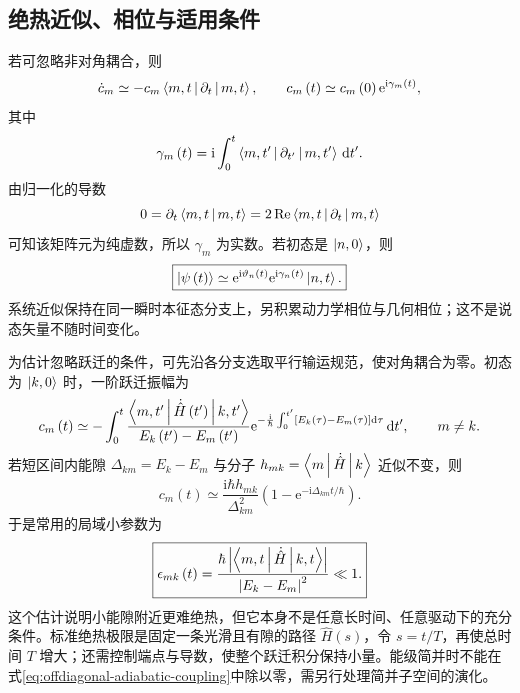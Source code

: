 \subsection{绝热近似、相位与适用条件}
若可忽略非对角耦合，则
\begin{equation}
\dot c_m\simeq-c_m\Braket{m,t|\partial_t|m,t},\qquad
c_m\left(t\right)\simeq c_m\left(0\right)\mathrm{e}^{\mathrm{i}\gamma_m\left(t\right)},
\end{equation}
其中
\begin{equation}
\gamma_m\left(t\right)=\mathrm{i}\int_0^t
\Braket{m,t'|\partial_{t'}|m,t'}\,\mathrm{d}t'.
\label{eq:adiabatic-geometric-phase}
\end{equation}
由归一化的导数
\begin{equation}
0=\partial_t\Braket{m,t|m,t}
=2\operatorname{Re}\Braket{m,t|\partial_t|m,t}
\end{equation}
可知该矩阵元为纯虚数，所以 $\gamma_m$ 为实数。若初态是 $\Ket{n,0}$，则
\begin{equation}
\boxed{\Ket{\psi\left(t\right)}\simeq
\mathrm{e}^{\mathrm{i}\vartheta_n\left(t\right)}
\mathrm{e}^{\mathrm{i}\gamma_n\left(t\right)}\Ket{n,t}.}
\label{eq:adiabatic-state}
\end{equation}
系统近似保持在同一瞬时本征态分支上，另积累动力学相位与几何相位；这不是说态矢量不随时间变化。

为估计忽略跃迁的条件，可先沿各分支选取平行输运规范，使对角耦合为零。初态为 $\Ket{k,0}$ 时，一阶跃迁振幅为
\begin{equation}
c_m\left(t\right)\simeq-\int_0^t
\frac{\Braket{m,t'|\dot{\hat H}\left(t'\right)|k,t'}}{E_k\left(t'\right)-E_m\left(t'\right)}
\mathrm{e}^{-\frac{\mathrm{i}}\hbar\int_0^{t'}\left[E_k\left(\tau\right)-E_m\left(\tau\right)\right]\mathrm{d}\tau}
\,\mathrm{d}t',\qquad m\neq k.
\end{equation}
若短区间内能隙 $\Delta_{km}=E_k-E_m$ 与分子 $h_{mk}=\Braket{m|\dot{\hat H}|k}$ 近似不变，则
\begin{equation}
c_m\left(t\right)\simeq
\frac{\mathrm{i}\hbar h_{mk}}{\Delta_{km}^2}
\left(1-\mathrm{e}^{-\mathrm{i}\Delta_{km}t/\hbar}\right).
\end{equation}
于是常用的局域小参数为
\begin{equation}
\boxed{\epsilon_{mk}\left(t\right)=
\frac{\hbar\left|\Braket{m,t|\dot{\hat H}|k,t}\right|}
{\left|E_k-E_m\right|^2}\ll1.}
\end{equation}
这个估计说明小能隙附近更难绝热，但它本身不是任意长时间、任意驱动下的充分条件。标准绝热极限是固定一条光滑且有隙的路径 $\hat H\left(s\right)$，令 $s=t/T$，再使总时间 $T$ 增大；还需控制端点与导数，使整个跃迁积分保持小量。能级简并时不能在式\eqref{eq:offdiagonal-adiabatic-coupling}中除以零，需另行处理简并子空间的演化。

